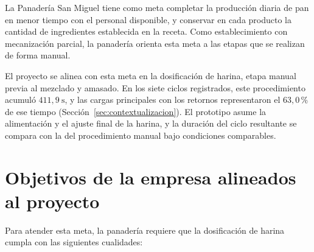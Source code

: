 La Panadería San Miguel tiene como meta completar la producción diaria de
pan en menor tiempo con el personal disponible, y conservar en cada
producto la cantidad de ingredientes establecida en la receta. Como
establecimiento con mecanización parcial, la panadería orienta esta meta a
las etapas que se realizan de forma manual.

El proyecto se alinea con esta meta en la dosificación de harina, etapa
manual previa al mezclado y amasado. En los siete ciclos registrados, este
procedimiento acumuló $411{,}9\ \mathrm{s}$, y las cargas principales con
los retornos representaron el $63{,}0$\,\% de ese tiempo
(Sección~\ref{sec:contextualizacion}). El prototipo asume la alimentación y
el ajuste final de la harina, y la duración del ciclo resultante se compara
con la del procedimiento manual bajo condiciones comparables.


\section{Objetivos de la empresa alineados al proyecto}
\label{sec:objetivos_empresa}

Para atender esta meta, la panadería requiere que la dosificación de harina
cumpla con las siguientes cualidades:

